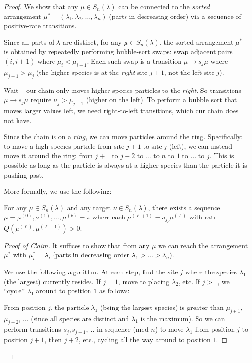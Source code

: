 \documentclass[12pt]{article}
\theoremstyle{definition}
\begin{document}
\begin{proof}
We show that any $\mu \in S_n(\lambda)$ can be connected to the
\emph{sorted} arrangement $\mu^* = (\lambda_1, \lambda_2, \dots, \lambda_n)$
(parts in decreasing order) via a sequence of positive-rate transitions.

Since all parts of $\lambda$ are distinct, for any $\mu \in S_n(\lambda)$, the
sorted arrangement $\mu^*$ is obtained by repeatedly performing bubble-sort
swaps: swap adjacent pairs $(i, i+1)$ where $\mu_i < \mu_{i+1}$.  Each such
swap is a transition $\mu \to s_j\mu$ where $\mu_{j+1} > \mu_j$ (the higher
species is at the \emph{right} site $j+1$, not the left site $j$).

Wait -- our chain only moves higher-species particles to the \emph{right}.  So
transitions $\mu \to s_j\mu$ require $\mu_j > \mu_{j+1}$ (higher on the left).
To perform a bubble sort that moves larger values left, we need right-to-left
transitions, which our chain does not have.

Since the chain is on a \emph{ring}, we can move particles around the ring.
Specifically: to move a high-species particle from site $j+1$ to site $j$ (left),
we can instead move it around the ring: from $j+1$ to $j+2$ to $\dots$ to $n$
to $1$ to $\dots$ to $j$.  This is possible as long as the particle is always
at a higher species than the particle it is pushing past.

More formally, we use the following:

\begin{claim}
For any $\mu \in S_n(\lambda)$ and any target $\nu \in S_n(\lambda)$, there
exists a sequence $\mu = \mu^{(0)}, \mu^{(1)}, \dots, \mu^{(k)} = \nu$ where
each $\mu^{(\ell+1)} = s_{j_\ell} \mu^{(\ell)}$ with rate $Q(\mu^{(\ell)},
\mu^{(\ell+1)}) > 0$.
\end{claim}

\begin{proof}[Proof of Claim]
It suffices to show that from any $\mu$ we can reach the arrangement $\mu^*$
with $\mu^*_i = \lambda_i$ (parts in decreasing order $\lambda_1 > \dots >
\lambda_n$).

We use the following algorithm.  At each step, find the site $j$ where the
species $\lambda_1$ (the largest) currently resides.  If $j = 1$, move to
placing $\lambda_2$, etc.  If $j > 1$, we ``cycle'' $\lambda_1$ around to
position $1$ as follows:

From position $j$, the particle $\lambda_1$ (being the largest species) is
greater than $\mu_{j+1}$, $\mu_{j+2}$, $\dots$ (since all species are distinct
and $\lambda_1$ is the maximum).  So we can perform transitions $s_j, s_{j+1},
\dots$ in sequence (mod $n$) to move $\lambda_1$ from position $j$ to position
$j+1$, then $j+2$, etc., cycling all the way around to position $1$.


\end{proof}
\end{proof}
\end{document}
